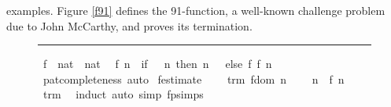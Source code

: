 \begin{isabellebody}
\begin{isamarkuptext}
  examples. Figure \ref{f91} defines the 91-function, a well-known
  challenge problem due to John McCarthy, and proves its termination.%
\end{isamarkuptext}%
\isamarkuptrue%
%
\begin{figure}
\hrule\vspace{6pt}
\begin{minipage}{0.8\textwidth}
\isastyle\isamarkuptrue
{}\isamarkupfalse%
\ f{}{}\ {}{}\ {}nat\ {}\ nat{}\isanewline
{}\isanewline
\ \ {}f{}{}\ n\ {}\ {}if\ {}{}{}\ {}\ n\ then\ n\ {}\ {}{}\ else\ f{}{}\ {}f{}{}\ {}n\ {}\ {}{}{}{}{}{}\isanewline
%
\isadelimproof
%
\endisadelimproof
%
\isatagproof
{}\isamarkupfalse%
\ pat{}completeness\ auto%
\endisatagproof
{\isafoldproof}%
%
\isadelimproof
\isanewline
%
\endisadelimproof
\isanewline
{}\isamarkupfalse%
\ f{}{}{}estimate{}\ \isanewline
\ \ \ trm{}\ {}f{}{}{}dom\ n{}\ \isanewline
\ \ \ {}n\ {}\ f{}{}\ n\ {}\ {}{}{}\isanewline
%
\isadelimproof
%
\endisadelimproof
%
\isatagproof
{}\isamarkupfalse%
\ trm\ \isamarkupfalse%
\ induct\ {}auto\ simp{}\ f{}{}{}psimps{}%

\end{minipage}
\end{figure}
\end{isabellebody}
